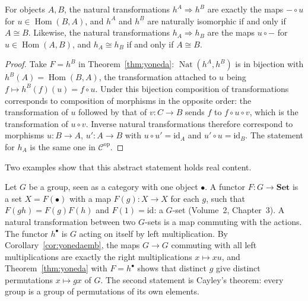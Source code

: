 \begin{corollary}\label{cor:yonedaemb}
For objects $A,B$, the natural transformations $h^A\Rightarrow h^B$ are exactly the maps $-\circ u$ for $u\in\operatorname{Hom}(B,A)$, and $h^A$ and $h^B$ are naturally isomorphic if and only if $A\cong B$. Likewise,
the natural transformations $h_A\Rightarrow h_B$ are the maps $u\circ-$ for $u\in\operatorname{Hom}(A,B)$, and $h_A\cong h_B$ if and only if $A\cong B$.
\end{corollary}

\begin{proof}
Take $F=h^B$ in Theorem~\ref{thm:yoneda}: $\operatorname{Nat}(h^A,h^B)$ is in bijection with $h^B(A)=\operatorname{Hom}(B,A)$, the transformation attached to $u$ being $f\mapsto h^B(f)(u)=f\circ u$. Under this bijection
composition of transformations corresponds to composition of morphisms in the opposite order: the transformation of $u$ followed by that of $v\colon C\to B$ sends $f$ to $f\circ u\circ v$, which is the transformation
of $u\circ v$. Inverse natural transformations therefore correspond to morphisms $u\colon B\to A$, $u'\colon A\to B$ with $u\circ u'=\mathrm{id}_A$ and $u'\circ u=\mathrm{id}_B$. The statement for $h_A$ is the same one in $\mathcal C^{\mathrm{op}}$.
\end{proof}

Two examples show that this abstract statement holds real content.

\begin{example}\label{ex:cayley}
Let $G$ be a group, seen as a category with one object $\bullet$. A functor $F\colon G\to\mathbf{Set}$ is a set $X=F(\bullet)$ with a map $F(g)\colon X\to X$ for each $g$, such that $F(gh)=F(g)F(h)$ and $F(1)=\mathrm{id}$: a $G$-set
(Volume~2, Chapter~3). A natural transformation between two $G$-sets is a map commuting with the actions. The functor $h^\bullet$ is $G$ acting on itself by left multiplication. By Corollary~\ref{cor:yonedaemb}, the maps
$G\to G$ commuting with all left multiplications are exactly the right multiplications $x\mapsto xu$, and Theorem~\ref{thm:yoneda} with $F=h^\bullet$ shows that distinct $g$ give distinct permutations
$x\mapsto gx$ of $G$. The second statement is Cayley's theorem: every group is a group of permutations of its own elements.
\end{example}


